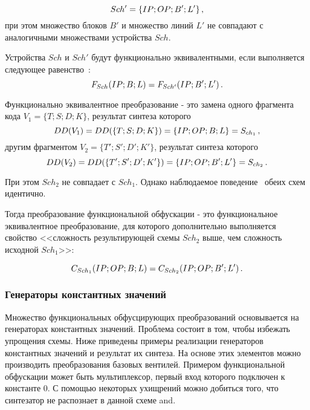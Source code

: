 \begin{equation}
  Sch' = \{IP;OP;B';L'\} \text{\,,}
  \label{eq:domain:lexical:schema}
\end{equation}
при этом множество блоков $B'$ и множество линий $L'$ не совпадают с аналогичными множествами устройства $Sch$.

Устройства $Sch$ и $Sch'$ будут функционально эквивалентными, если выполняется следующее равенство~\cite{ivaniuk}:
\begin{equation}
  F_{Sch}(IP;B;L) = F_{Sch'}(IP;B';L') \text{\,.}
  \label{eq:domain:functional:basis}
\end{equation}

Функционально эквивалентное преобразование - это замена одного фрагмента кода $V_1 = \{T;S;D;K\}$, результат синтеза которого
\begin{equation}
  DD(V_1) = DD(\{T;S;D;K\}) = \{IP;OP;B;L\} = S_{ch_1} \text{\,,}
  \label{eq:domain:functional:schema}
\end{equation}
другим фрагментом $V_2 = \{T';S';D';K'\}$, результат синтеза которого
\begin{equation}
  DD(V_2) = DD(\{T';S';D';K'\}) = \{IP;OP;B';L'\} = S_{ch_2} \text{\,.}
  \label{eq:domain:functional:schema}
\end{equation}

При этом $Sch_2$ не совпадает с $Sch_1$. Однако наблюдаемое поведение~\cite{collberg} обеих схем идентично.

Тогда преобразование функциональной обфускации - это функциональное эквивалентное преобразование, для которого дополнительно выполняется свойство <<сложность результирующей схемы $Sch_2$ выше, чем сложность исходной $Sch_1$>>:

\begin{equation}
  C_{Sch_1}(IP;OP;B;L) = C_{Sch_2}(IP;OP;B';L') \text{\,.}
  \label{eq:domain:functional:schema}
\end{equation}

\subsubsection{Генераторы константных значений}

Множество функциональных обфусцирующих преобразований основывается на генераторах константных значений. Проблема состоит в том, чтобы избежать упрощения схемы. Ниже приведены примеры реализации генераторов константных значений и результат их синтеза. На основе этих элементов можно производить преобразования базовых вентилей. Примером функциональной обфускации может быть мультиплексор, первый вход которого подключен к константе 0. С помощью некоторых ухищрений можно добиться того, что синтезатор не распознает в данной схеме and.


